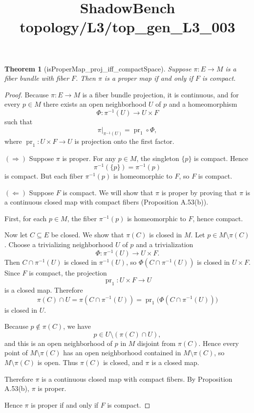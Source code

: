 \documentclass{article}
\title{ShadowBench topology/L3/top\_gen\_L3\_003}
\newtheorem{theorem}{Theorem}
\begin{document}
\maketitle

\begin{theorem}[isProperMap_proj_iff_compactSpace]
Suppose $\pi : E \to M$ is a fiber bundle with fiber $F$.
Then $\pi$ is a proper map if and only if $F$ is compact.
\end{theorem}

\begin{proof}
Because $\pi : E \to M$ is a fiber bundle projection, it is continuous, and for every $p \in M$ there exists an open neighborhood $U$ of $p$ and a homeomorphism
\[
\Phi:\pi^{-1}(U)\to U\times F
\]
such that
\[
\pi|_{\pi^{-1}(U)}=\operatorname{pr}_1\circ \Phi,
\]
where $\operatorname{pr}_1:U\times F\to U$ is projection onto the first factor.

\medskip
\noindent $(\Rightarrow)$ Suppose $\pi$ is proper. For any $p\in M$, the singleton $\{p\}$ is compact. Hence
\[
\pi^{-1}(\{p\})=\pi^{-1}(p)
\]
is compact. But each fiber $\pi^{-1}(p)$ is homeomorphic to $F$, so $F$ is compact.

\medskip
\noindent $(\Leftarrow)$ Suppose $F$ is compact. We will show that $\pi$ is proper by proving that $\pi$ is a continuous closed map with compact fibers (Proposition A.53(b)).

First, for each $p\in M$, the fiber $\pi^{-1}(p)$ is homeomorphic to $F$, hence compact.

Now let $C\subseteq E$ be closed. We show that $\pi(C)$ is closed in $M$. Let $p\in M\setminus \pi(C)$. Choose a trivializing neighborhood $U$ of $p$ and a trivialization
\[
\Phi:\pi^{-1}(U)\to U\times F.
\]
Then $C\cap \pi^{-1}(U)$ is closed in $\pi^{-1}(U)$, so $\Phi(C\cap \pi^{-1}(U))$ is closed in $U\times F$. Since $F$ is compact, the projection
\[
\operatorname{pr}_1:U\times F\to U
\]
is a closed map. Therefore
\[
\pi(C)\cap U
=
\pi(C\cap \pi^{-1}(U))
=
\operatorname{pr}_1\bigl(\Phi(C\cap \pi^{-1}(U))\bigr)
\]
is closed in $U$.

Because $p\notin \pi(C)$, we have
\[
p\in U\setminus (\pi(C)\cap U),
\]
and this is an open neighborhood of $p$ in $M$ disjoint from $\pi(C)$. Hence every point of $M\setminus \pi(C)$ has an open neighborhood contained in $M\setminus \pi(C)$, so $M\setminus \pi(C)$ is open. Thus $\pi(C)$ is closed, and $\pi$ is a closed map.

Therefore $\pi$ is a continuous closed map with compact fibers. By Proposition A.53(b), $\pi$ is proper.

Hence $\pi$ is proper if and only if $F$ is compact.
\end{proof}
\end{document}
